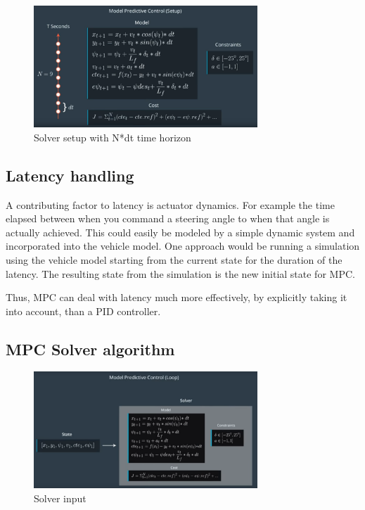 \documentclass[11pt]{article}
\begin{document}
\begin{figure}[h]
    \centering
    \includegraphics[width=0.75\textwidth]{solver_setup}
    \caption{Solver setup with N*dt time horizon}
    \label{fig:solver_setup}
\end{figure}

\subsection{Latency handling}


A contributing factor to latency is actuator dynamics. For example the time elapsed between when you command a steering angle to when that angle is actually achieved. This could easily be modeled by a simple dynamic system and incorporated into the vehicle model. One approach would be running a simulation using the vehicle model starting from the current state for the duration of the latency. The resulting state from the simulation is the new initial state for MPC.

Thus, MPC can deal with latency much more effectively, by explicitly taking it into account, than a PID controller.

\subsection{MPC Solver algorithm}

\begin{figure}[h]
    \centering
    \includegraphics[width=0.75\textwidth]{solver_in}
    \caption{Solver input}
    \label{fig:solver_in}
\end{figure}
\end{document}
